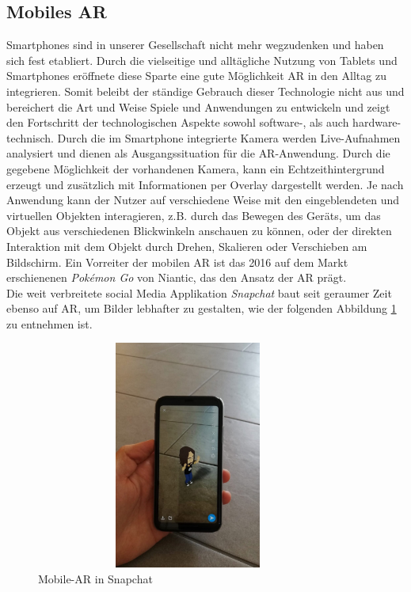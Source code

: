 \subsection*{Mobiles AR}
Smartphones sind in unserer Gesellschaft nicht mehr wegzudenken und haben sich fest etabliert. Durch die vielseitige und alltägliche Nutzung 
von Tablets und Smartphones eröffnete diese Sparte eine gute Möglichkeit \acl{AR} in den Alltag zu integrieren. Somit beleibt der ständige 
Gebrauch dieser Technologie nicht aus und bereichert die Art und Weise Spiele und Anwendungen zu entwickeln und zeigt den Fortschritt der technologischen 
Aspekte sowohl software-, als auch hardware-technisch.
Durch die im Smartphone integrierte Kamera werden Live-Aufnahmen analysiert und dienen als Ausgangssituation für die \acs{AR}-Anwendung. Durch 
die gegebene Möglichkeit der vorhandenen Kamera, kann ein Echtzeithintergrund erzeugt und zusätzlich mit Informationen per Overlay dargestellt 
werden. Je nach Anwendung kann der Nutzer auf verschiedene Weise mit den eingeblendeten und virtuellen Objekten interagieren, z.B. durch das 
Bewegen des Geräts, um das Objekt aus verschiedenen Blickwinkeln anschauen zu können, oder der direkten Interaktion mit dem Objekt durch 
Drehen, Skalieren oder Verschieben am Bildschirm. Ein Vorreiter der mobilen AR ist das 2016 auf dem Markt erschienenen \textit{Pokémon Go} 
von Niantic, das den Ansatz der \acs{AR} prägt. \cite{pokemongo.2016a}
\\ 
\linebreak
Die weit verbreitete social Media Applikation \textit{Snapchat} baut seit geraumer Zeit ebenso auf \acl{AR}, um Bilder lebhafter zu 
gestalten, wie der folgenden Abbildung \ref{pic:snapchatAR} zu entnehmen ist. 
\\ 
\linebreak 
\begin{figure}[hbt!]
    \centering
    \includegraphics[width=10cm,height=7.5cm,keepaspectratio]{2Grundlagen/Bilder/snapchatAR.jpeg}
    \caption{Mobile-AR in Snapchat}
    \label{pic:snapchatAR}
\end{figure}
